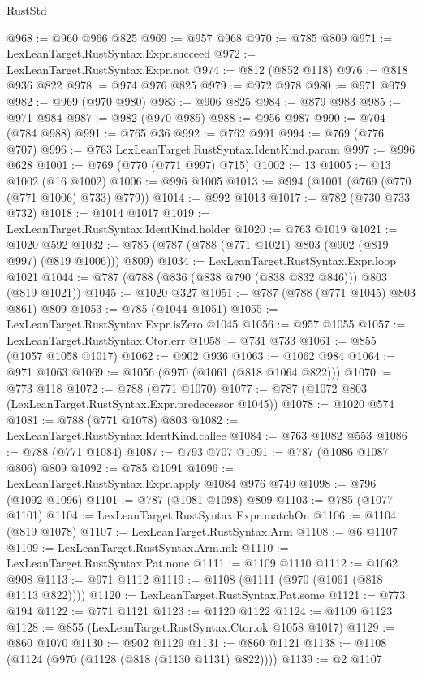 \begin{lexlean}{RustStd}
\begin{coremodule}
@968 := @960 @966 @825
@969 := @957 @968
@970 := @785 @809
@971 := LexLeanTarget.RustSyntax.Expr.succeed
@972 := LexLeanTarget.RustSyntax.Expr.not
@974 := @812 (@852 @118)
@976 := @818 @936 @822
@978 := @974 @976 @825
@979 := @972 @978
@980 := @971 @979
@982 := @969 (@970 @980)
@983 := @906 @825
@984 := @879 @983
@985 := @971 @984
@987 := @982 (@970 @985)
@988 := @956 @987
@990 := @704 (@784 @988)
@991 := @765 @36
@992 := @762 @991
@994 := @769 (@776 @707)
@996 := @763 LexLeanTarget.RustSyntax.IdentKind.param
@997 := @996 @628
@1001 := @769 (@770 (@771 @997) @715)
@1002 := 13
@1005 := @13 @1002 (@16 @1002)
@1006 := @996 @1005
@1013 := @994 (@1001 (@769 (@770 (@771 @1006) @733) @779))
@1014 := @992 @1013
@1017 := @782 (@730 @733 @732)
@1018 := @1014 @1017
@1019 := LexLeanTarget.RustSyntax.IdentKind.holder
@1020 := @763 @1019
@1021 := @1020 @592
@1032 := @785 (@787 (@788 (@771 @1021) @803 (@902 (@819 @997) (@819 @1006))) @809)
@1034 := LexLeanTarget.RustSyntax.Expr.loop @1021
@1044 := @787 (@788 (@836 (@838 @790 (@838 @832 @846))) @803 (@819 @1021))
@1045 := @1020 @327
@1051 := @787 (@788 (@771 @1045) @803 @861) @809
@1053 := @785 (@1044 @1051)
@1055 := LexLeanTarget.RustSyntax.Expr.isZero @1045
@1056 := @957 @1055
@1057 := LexLeanTarget.RustSyntax.Ctor.err
@1058 := @731 @733
@1061 := @855 (@1057 @1058 @1017)
@1062 := @902 @936
@1063 := @1062 @984
@1064 := @971 @1063
@1069 := @1056 (@970 (@1061 (@818 @1064 @822)))
@1070 := @773 @118
@1072 := @788 (@771 @1070)
@1077 := @787 (@1072 @803 (LexLeanTarget.RustSyntax.Expr.predecessor @1045))
@1078 := @1020 @574
@1081 := @788 (@771 @1078) @803
@1082 := LexLeanTarget.RustSyntax.IdentKind.callee
@1084 := @763 @1082 @553
@1086 := @788 (@771 @1084)
@1087 := @793 @707
@1091 := @787 (@1086 @1087 @806) @809
@1092 := @785 @1091
@1096 := LexLeanTarget.RustSyntax.Expr.apply @1084 @976 @740
@1098 := @796 (@1092 @1096)
@1101 := @787 (@1081 @1098) @809
@1103 := @785 (@1077 @1101)
@1104 := LexLeanTarget.RustSyntax.Expr.matchOn
@1106 := @1104 (@819 @1078)
@1107 := LexLeanTarget.RustSyntax.Arm
@1108 := @6 @1107
@1109 := LexLeanTarget.RustSyntax.Arm.mk
@1110 := LexLeanTarget.RustSyntax.Pat.none
@1111 := @1109 @1110
@1112 := @1062 @908
@1113 := @971 @1112
@1119 := @1108 (@1111 (@970 (@1061 (@818 @1113 @822))))
@1120 := LexLeanTarget.RustSyntax.Pat.some
@1121 := @773 @194
@1122 := @771 @1121
@1123 := @1120 @1122
@1124 := @1109 @1123
@1128 := @855 (LexLeanTarget.RustSyntax.Ctor.ok @1058 @1017)
@1129 := @860 @1070
@1130 := @902 @1129
@1131 := @860 @1121
@1138 := @1108 (@1124 (@970 (@1128 (@818 (@1130 @1131) @822))))
@1139 := @2 @1107

\end{coremodule}
\end{lexlean}
